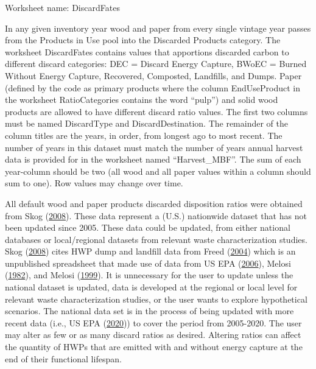 \documentclass[
  openany]{book}
\begin{document}
Worksheet name: DiscardFates

In any given inventory year wood and paper from every single vintage
year passes from the Products in Use pool into the Discarded Products
category. The worksheet DiscardFates contains values that apportions
discarded carbon to different discard categories: DEC = Discard Energy
Capture, BWoEC = Burned Without Energy Capture, Recovered, Composted,
Landfills, and Dumps. Paper (defined by the code as primary products
where the column EndUseProduct in the worksheet RatioCategories contains
the word ``pulp'') and solid wood products are allowed to have different
discard ratio values. The first two columns must be named DiscardType
and DiscardDestination. The remainder of the column titles are the
years, in order, from longest ago to most recent. The number of years in
this dataset must match the number of years annual harvest data is
provided for in the worksheet named ``Harvest\_MBF''. The sum of each
year-column should be two (all wood and all paper values within a column
should sum to one). Row values may change over time.

All default wood and paper products discarded disposition ratios were
obtained from Skog (\protect\hyperlink{ref-skog2008}{2008}). These data
represent a (U.S.) nationwide dataset that has not been updated since
2005. These data could be updated, from either national databases or
local/regional datasets from relevant waste characterization studies.
Skog (\protect\hyperlink{ref-skog2008}{2008}) cites HWP dump and
landfill data from Freed (\protect\hyperlink{ref-freed2004}{2004}) which
is an unpublished spreadsheet that made use of data from US EPA
(\protect\hyperlink{ref-epa2006}{2006}), Melosi
(\protect\hyperlink{ref-melosi1982}{1982}), and Melosi
(\protect\hyperlink{ref-melosi1999}{1999}). It is unnecessary for the
user to update unless the national dataset is updated, data is developed
at the regional or local level for relevant waste characterization
studies, or the user wants to explore hypothetical scenarios. The
national data set is in the process of being updated with more recent
data (i.e., US EPA (\protect\hyperlink{ref-usepa2020}{2020})) to cover
the period from 2005-2020. The user may alter as few or as many discard
ratios as desired. Altering ratios can affect the quantity of HWPs that
are emitted with and without energy capture at the end of their
functional lifespan.
\end{document}
